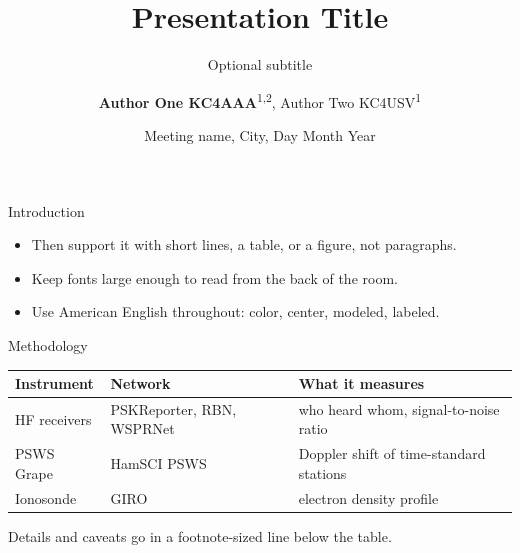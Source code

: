 \documentclass[aspectratio=169,10pt]{beamer}
\title{Presentation Title}
\subtitle{Optional subtitle}
\author{\textbf{Author One KC4AAA}\texorpdfstring{\textsuperscript{1,2}}{}, Author Two KC4USV\texorpdfstring{\textsuperscript{1}}{}}
\institute{\textsuperscript{1}HamSCI\\\textsuperscript{2}Institution Two}
\date{Meeting name, City, Day Month Year}
\begin{document}
\hamscititleframe


\begin{frame}{Introduction}
\begin{itemize}
  \item Then support it with short lines, a table, or a figure, not paragraphs.
  \item Keep fonts large enough to read from the back of the room.
  \item Use American English throughout: color, center, modeled, labeled.
\end{itemize}
\end{frame}


\begin{frame}{Methodology}
\small
\begin{tabular}{@{}lll@{}}
\toprule
Instrument & Network & What it measures \\
\midrule
HF receivers & PSKReporter, RBN, WSPRNet & who heard whom, signal-to-noise ratio \\
PSWS Grape & HamSCI PSWS & Doppler shift of time-standard stations \\
Ionosonde & GIRO & electron density profile \\
\bottomrule
\end{tabular}\par\vskip10pt
\footnotesize Details and caveats go in a footnote-sized line below the table.
\end{frame}
\end{document}
